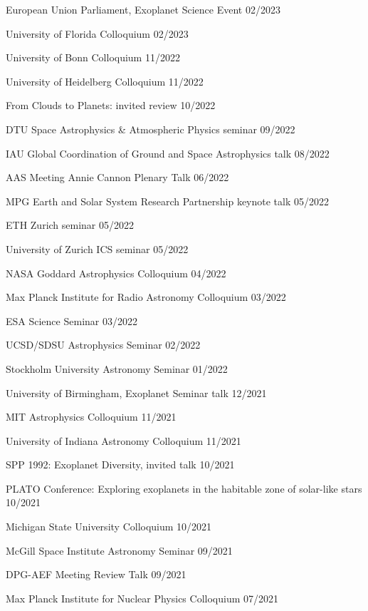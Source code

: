 \documentclass[12pt,letterpaper]{article}
\begin{document}
\begin{list}{}{\cvlist}
\item {European Union Parliament, Exoplanet Science Event \hfill 02/2023}
\item {University of Florida Colloquium \hfill 02/2023}
\item {University of Bonn Colloquium \hfill 11/2022}
\item {University of Heidelberg Colloquium \hfill 11/2022}
\item {From Clouds to Planets: invited review \hfill 10/2022}
\item {DTU Space Astrophysics \& Atmospheric Physics seminar \hfill 09/2022}
\item {IAU Global Coordination of Ground and Space Astrophysics talk \hfill 08/2022}
\item {AAS Meeting Annie Cannon Plenary Talk \hfill 06/2022}
\item {MPG Earth and Solar System Research Partnership keynote talk \hfill 05/2022}
\item {ETH Zurich seminar \hfill 05/2022}
\item {University of Zurich ICS seminar \hfill 05/2022}
\item {NASA Goddard Astrophysics Colloquium \hfill 04/2022}
\item {Max Planck Institute for Radio Astronomy Colloquium \hfill 03/2022}
\item {ESA Science Seminar \hfill 03/2022}
\item {UCSD/SDSU Astrophysics Seminar \hfill 02/2022}
\item {Stockholm University Astronomy Seminar \hfill 01/2022}
\item {University of Birmingham, Exoplanet Seminar talk \hfill 12/2021}
\item {MIT Astrophysics Colloquium \hfill 11/2021}
\item {University of Indiana Astronomy Colloquium \hfill 11/2021}
\item {SPP 1992: Exoplanet Diversity, invited talk \hfill 10/2021}
\item {PLATO Conference: Exploring exoplanets in the habitable zone of solar-like stars \hfill 10/2021}
\item {Michigan State University Colloquium \hfill 10/2021}
\item {McGill Space Institute Astronomy Seminar \hfill 09/2021}
\item {DPG-AEF Meeting Review Talk \hfill  09/2021}
\item {Max Planck Institute for Nuclear Physics Colloquium \hfill 07/2021}

\end{list}
\end{document}
